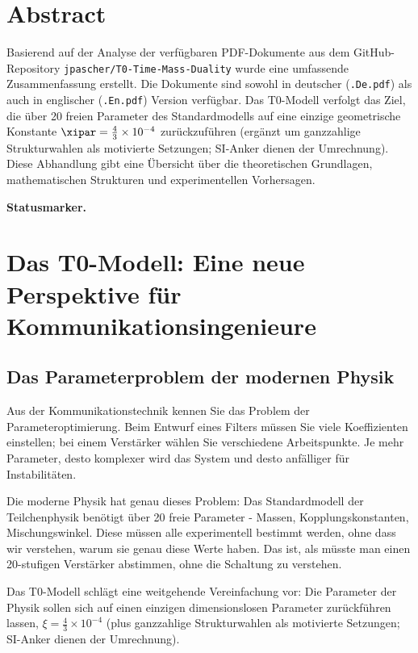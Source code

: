 \section*{Abstract}
Basierend auf der Analyse der verfügbaren PDF-Dokumente aus dem GitHub-Repository \texttt{jpascher/T0-Time-Mass-Duality} wurde eine umfassende Zusammenfassung erstellt. Die Dokumente sind sowohl in deutscher (\texttt{.De.pdf}) als auch in englischer (\texttt{.En.pdf}) Version verfügbar. Das T0-Modell verfolgt das Ziel, die über 20 freien Parameter des Standardmodells auf eine einzige geometrische Konstante $\xipar = \frac{4}{3} \times 10^{-4}$ zurückzuführen (ergänzt um ganzzahlige Strukturwahlen als motivierte Setzungen; SI-Anker dienen der Umrechnung). Diese Abhandlung gibt eine Übersicht über die theoretischen Grundlagen, mathematischen Strukturen und experimentellen Vorhersagen.

\medskip\noindent\textbf{Statusmarker.}



\section{Das T0-Modell: Eine neue Perspektive für Kommunikationsingenieure}

\subsection{Das Parameterproblem der modernen Physik}

Aus der Kommunikationstechnik kennen Sie das Problem der Parameteroptimierung. Beim Entwurf eines Filters müssen Sie viele Koeffizienten einstellen; bei einem Verstärker wählen Sie verschiedene Arbeitspunkte. Je mehr Parameter, desto komplexer wird das System und desto anfälliger für Instabilitäten.

Die moderne Physik hat genau dieses Problem: Das Standardmodell der Teilchenphysik benötigt über 20 freie Parameter - Massen, Kopplungskonstanten, Mischungswinkel. Diese müssen alle experimentell bestimmt werden, ohne dass wir verstehen, warum sie genau diese Werte haben. Das ist, als müsste man einen 20-stufigen Verstärker abstimmen, ohne die Schaltung zu verstehen.

Das T0-Modell schlägt eine weitgehende Vereinfachung vor: Die Parameter der Physik sollen sich auf einen einzigen dimensionslosen Parameter zurückführen lassen, $\xi = \frac{4}{3} \times 10^{-4}$ (plus ganzzahlige Strukturwahlen als motivierte Setzungen; SI-Anker dienen der Umrechnung).

